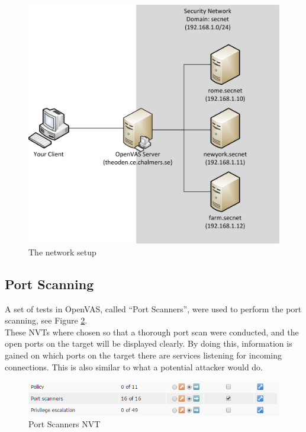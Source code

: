 \begin{figure}[hbt]
  \centering
  \includegraphics[scale=.4]{figures/setup.png}
  \caption{The network setup} \label{fig:setup}
\end{figure}



\subsection{Port Scanning}
\label{sub:port_set}

A set of tests in OpenVAS, called “Port Scanners”, were used to perform the port scanning, see Figure \ref{fig:portscanners}. \\

\noindent These NVTs where chosen so that a thorough port scan were conducted, and the open ports on the target will be displayed clearly. By doing this, information is gained on which ports on the target there are services listening for incoming connections. This is also similar to what a potential attacker would do.

\begin{figure}[htb]
  \centering
  \includegraphics[scale=.4]{figures/port_nvt}
  \caption{Port Scanners NVT} \label{fig:portscanners}
\end{figure}


